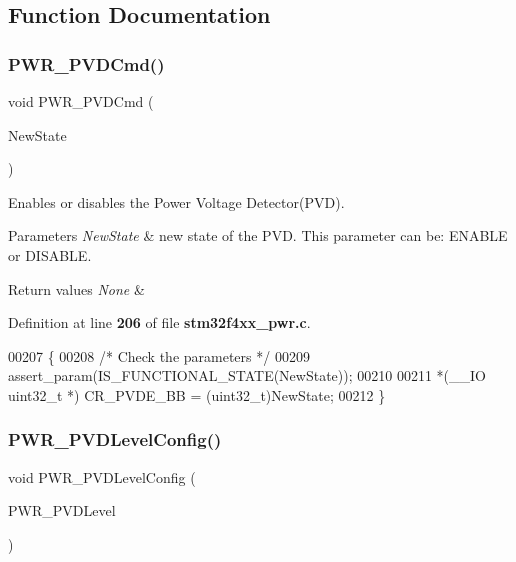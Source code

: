 \subsection{Function Documentation}
\mbox{\label{group__PWR__Group2_ga42cad476b816e0a33594a933b3ed1acd}} 
\subsubsection{P\+W\+R\+\_\+\+P\+V\+D\+Cmd()}
{\footnotesize\ttfamily void P\+W\+R\+\_\+\+P\+V\+D\+Cmd (\begin{DoxyParamCaption}\item[{\textbf{ Functional\+State}}]{New\+State }\end{DoxyParamCaption})}



Enables or disables the Power Voltage Detector(\+P\+V\+D). 


\begin{DoxyParams}{Parameters}
{\em New\+State} & new state of the P\+VD. This parameter can be\+: E\+N\+A\+B\+LE or D\+I\+S\+A\+B\+LE. \\
\hline
\end{DoxyParams}

\begin{DoxyRetVals}{Return values}
{\em None} & \\
\hline
\end{DoxyRetVals}


Definition at line \textbf{ 206} of file \textbf{ stm32f4xx\+\_\+pwr.\+c}.


\begin{DoxyCode}
00207 \{
00208   \textcolor{comment}{/* Check the parameters */}
00209   assert_param(IS_FUNCTIONAL_STATE(NewState));
00210   
00211   *(\_\_IO uint32\_t *) CR_PVDE_BB = (uint32\_t)NewState;
00212 \}
\end{DoxyCode}
\mbox{\label{group__PWR__Group2_ga237c143ef6aa55abb8049fa7bf24ab8f}} 
\subsubsection{P\+W\+R\+\_\+\+P\+V\+D\+Level\+Config()}
{\footnotesize\ttfamily void P\+W\+R\+\_\+\+P\+V\+D\+Level\+Config (\begin{DoxyParamCaption}\item[{uint32\+\_\+t}]{P\+W\+R\+\_\+\+P\+V\+D\+Level }\end{DoxyParamCaption})}



